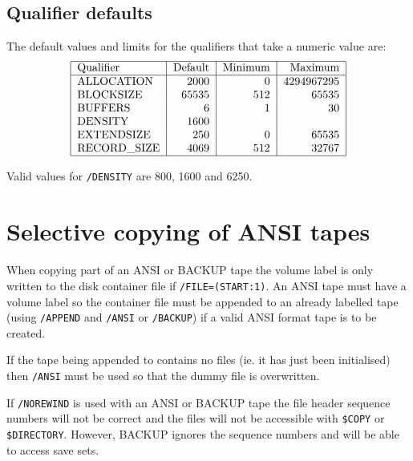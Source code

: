 \subsection{Qualifier defaults}
The default values and limits for the qualifiers that take a numeric value are:
\[\tt\begin{tabular}{|l|r|r|r|}\hline
Qualifier    &Default &Minimum &Maximum \\\hline
ALLOCATION   &2000    &0       &4294967295\\
BLOCKSIZE    &65535   &512     &65535   \\
BUFFERS      &6       &1       &30      \\
DENSITY      &1600    &        &        \\
EXTENDSIZE   &250     &0       &65535   \\
RECORD\_SIZE &4069    &512     &32767   \\
\hline\end{tabular}\]

Valid values for {\tt/DENSITY} are 800, 1600 and 6250.

\section{Selective copying of ANSI tapes}\label{selective}

When copying part of an ANSI or BACKUP tape the volume label is only written to
the disk container file if {\tt/FILE=(START:1)}. An ANSI tape must have a
volume label so the container file must  be appended to an already labelled
tape (using {\tt/APPEND} and {\tt/ANSI} or {\tt/BACKUP}) if a valid ANSI format
tape is to be created.

If the tape being appended to contains no files (ie. it has just been
initialised) then {\tt/ANSI} must be used so that the dummy file is
overwritten.

If {\tt/NOREWIND} is used with an ANSI or BACKUP tape the file header sequence
numbers will not be correct and the files will not be accessible with
{\tt\$COPY} or {\tt\$DIRECTORY}. However, BACKUP ignores the sequence numbers
and will be able to access save sets. 
